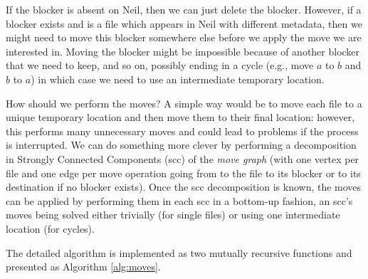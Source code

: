 \documentclass[twoside,envcountsame,runningheads]{llncs}
\begin{document}
If the blocker is absent on Neil, then we can just delete the blocker. However, if a blocker exists and is a file which appears in Neil with different metadata, then we might need to move this blocker somewhere else before we apply the move we are interested in. Moving the blocker might be impossible because of another blocker that we need to keep, and so on, possibly ending in a cycle (e.g., move $a$ to $b$ and $b$ to $a$) in which case we need to use an intermediate temporary location.

How should we perform the moves? A simple way would be to move each file to a unique temporary location and then move them to their final location: however, this performs many unnecessary moves and could lead to problems if the process is interrupted. We can do something more clever by performing a decomposition in Strongly Connected Components ({\sc scc}) of the \textit{move graph} (with one vertex per file and one edge per move operation going from to the file to its blocker or to its destination if no blocker exists).
Once the {\sc scc} decomposition is known, the moves can be applied by performing them in each {\sc scc} in a bottom-up fashion, an {\sc scc}'s moves being solved either trivially (for single files) or using one intermediate location (for cycles).

The detailed algorithm is implemented as two mutually recursive functions and presented as Algorithm \ref{alg:moves}.
\end{document}
